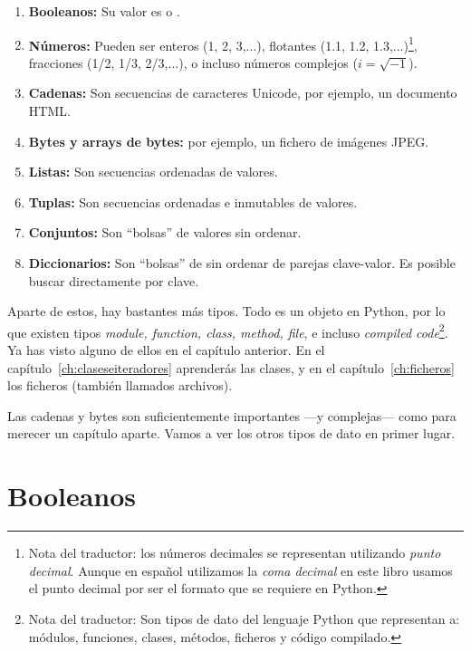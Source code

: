 \begin{enumerate}

\item \textbf{Booleanos:} Su valor es  o .

\item \textbf{Números:} Pueden ser enteros (1, 2, 3,...), flotantes (1.1, 1.2, 1.3,...)\footnote{Nota del traductor: los números decimales se representan utilizando \emph{punto decimal}. Aunque en español utilizamos la \emph{coma decimal} en este libro usamos el punto decimal por ser el formato que se requiere en Python.}, fracciones (1/2, 1/3, 2/3,...), o incluso números complejos ($i = \sqrt{-1}$).

\item \textbf{Cadenas:} Son secuencias de caracteres Unicode, por ejemplo, un documento HTML.

\item \textbf{Bytes y arrays de bytes:} por ejemplo, un fichero de imágenes JPEG.

\item \textbf{Listas:} Son secuencias ordenadas de valores.

\item \textbf{Tuplas:} Son secuencias ordenadas e inmutables de valores.

\item \textbf{Conjuntos:} Son ``bolsas'' de valores sin ordenar.

\item \textbf{Diccionarios:} Son ``bolsas'' de sin ordenar de parejas clave-valor. Es posible buscar directamente por clave.

\end{enumerate}

Aparte de estos, hay bastantes más tipos. Todo es un objeto en Python, por lo que existen tipos \emph{module, function, class, method, file}, e incluso \emph{compiled code}\footnote{Nota del traductor: Son tipos de dato del lenguaje Python que representan a: módulos, funciones, clases, métodos, ficheros y código compilado.}. Ya has visto alguno de ellos en el capítulo anterior. En el capítulo~\ref{ch:claseseiteradores} aprenderás las clases, y en el capítulo~\ref{ch:ficheros} los ficheros (también llamados archivos).

Las cadenas y bytes son suficientemente importantes ---y complejas--- como para merecer un capítulo aparte. Vamos a ver los otros tipos de dato en primer lugar.

\section{Booleanos}

